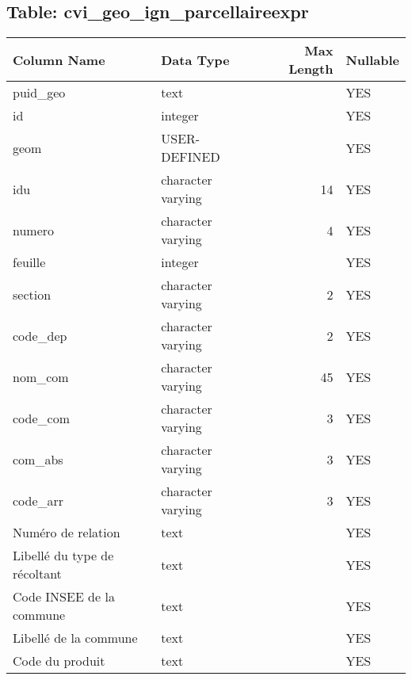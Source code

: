 \subsection*{Table: cvi_geo_ign_parcellaireexpr}
\begin{tabular}{llrl}
\hline
 Column Name                            & Data Type         &   Max Length & Nullable   \\
\hline
 puid_geo                               & text              &              & YES        \\
 id                                     & integer           &              & YES        \\
 geom                                   & USER-DEFINED      &              & YES        \\
 idu                                    & character varying &           14 & YES        \\
 numero                                 & character varying &            4 & YES        \\
 feuille                                & integer           &              & YES        \\
 section                                & character varying &            2 & YES        \\
 code_dep                               & character varying &            2 & YES        \\
 nom_com                                & character varying &           45 & YES        \\
 code_com                               & character varying &            3 & YES        \\
 com_abs                                & character varying &            3 & YES        \\
 code_arr                               & character varying &            3 & YES        \\
 Numéro de relation                     & text              &              & YES        \\
 Libellé du type de récoltant           & text              &              & YES        \\
 Code INSEE de la commune               & text              &              & YES        \\
 Libellé de la commune                  & text              &              & YES        \\
 Code du produit                        & text              &              & YES        \\

\end{tabular}
